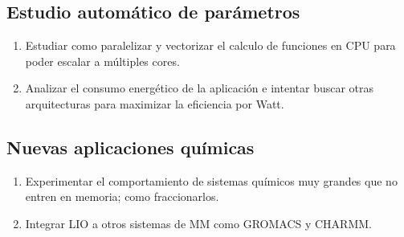 \subsection{Estudio autom\'atico de par\'ametros}
\begin{enumerate}
  \item Estudiar como paralelizar y vectorizar el calculo de funciones en CPU para poder escalar a m\'ultiples cores.
  \item Analizar el consumo energ\'etico de la aplicaci\'on e intentar buscar otras arquitecturas para maximizar
    la eficiencia por Watt.
\end{enumerate}

\subsection{Nuevas aplicaciones qu\'imicas}
\begin{enumerate}
  \item Experimentar el comportamiento de sistemas qu\'imicos muy grandes que no entren en memoria; como fraccionarlos.
  \item Integrar LIO a otros sistemas de MM como GROMACS y CHARMM.
\end{enumerate}
